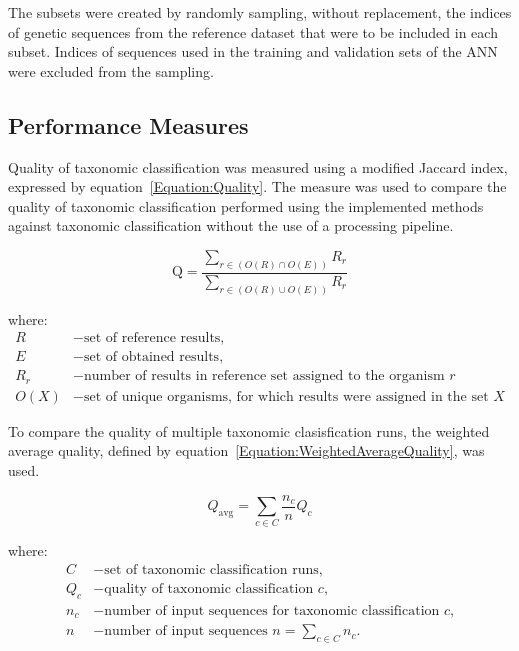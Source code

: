 \documentclass{article}
\begin{document}
                The subsets were created by randomly sampling, without replacement, the indices of genetic sequences from the reference dataset that were to be included in each subset. Indices of sequences used in the training and validation sets of the ANN were excluded from the sampling. 

        \subsection{Performance Measures}

            Quality of taxonomic classification was measured using a modified Jaccard index, expressed by equation~\ref{Equation:Quality}. The measure was used to compare the quality of taxonomic classification performed using the implemented methods against taxonomic classification without the use of a processing pipeline.

            \begin{equation}
                \text{Q} = \frac{
                    \sum_{r \in (O(R) \cap O(E))} R_{r}
                }{
                    \sum_{r \in (O(R) \cup O(E))} R_{r}
                }
                \label{Equation:Quality}
            \end{equation}

            where:
            \begin{align*}
                R &- \text{set of reference results,} \\
                E &- \text{set of obtained results,} \\
                R_{r} &- \text{number of results in reference set assigned to the organism $r$} \\
                O(X) &- \text{set of unique organisms, for which results were assigned in the set $X$}
            \end{align*}

            To compare the quality of multiple taxonomic clasisfication runs, the weighted average quality, defined by equation~\ref{Equation:WeightedAverageQuality}, was used.
            
            \begin{equation}
                Q_{\text{avg}} = \sum_{c \in C} \frac{n_c}{n} Q_c
                \label{Equation:WeightedAverageQuality}
            \end{equation}
    
            where:
            \begin{align*}
              C &- \text{set of taxonomic classification runs,} \\
              Q_c &- \text{quality of taxonomic classification $c$,} \\
              n_c &- \text{number of input sequences for taxonomic classification $c$,}\\
              n   &- \text{number of input sequences $n = \sum_{c \in C} n_{c}.$}
            \end{align*}
\end{document}
